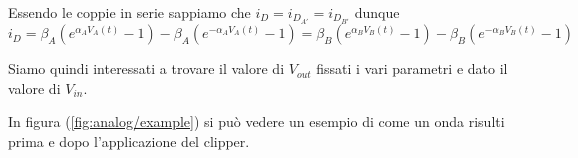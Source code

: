 		Essendo le coppie in serie sappiamo che $i_{D} = i_{D_{A'}} = i_{D_{B'}}$ dunque
		\[
			i_{D} = \beta_{A}\left(e^{\alpha_{A}V_{A}(t)}-1\right)-\beta_{A}\left(e^{-\alpha_{A}V_{A}(t)}-1\right) = \beta_{B}\left(e^{\alpha_{B}V_{B}(t)}-1\right)-\beta_{B}\left(e^{-\alpha_{B}V_{B}(t)}-1\right)
		\]
		
		Siamo quindi interessati a trovare il valore di $V_{out}$ fissati i vari parametri e dato il valore di $V_{in}$.
		
		\vspace{30px}
		In figura (\ref{fig:analog/example}) si può vedere un esempio di come un onda risulti prima e dopo l'applicazione del clipper.
		
